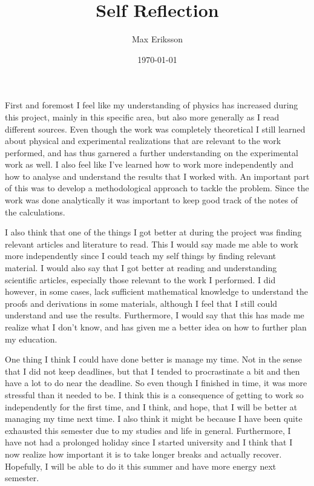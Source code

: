 \documentclass[12pt]{article}
\title{Self Reflection}
\date{\today}
\author{Max Eriksson}
\begin{document}
\maketitle

First and foremost I feel like my understanding of physics has increased during this project, mainly in this specific area, but also more generally as I read different sources. Even though the work was completely theoretical I still learned about physical and experimental realizations that are relevant to the work performed, and has thus garnered a further understanding on the experimental work as well. I also feel like I've learned how to work more independently and how to analyse and understand the results that I worked with. An important part of this was to develop a methodological approach to tackle the problem. Since the work was done analytically it was important to keep good track of the notes of the calculations.

I also think that one of the things I got better at during the project was finding relevant articles and literature to read. This I would say made me able to work more independently since I could teach my self things by finding relevant material. I would also say that I got better at reading and understanding scientific articles, especially those relevant to the work I performed. I did however, in some cases, lack sufficient mathematical knowledge to understand the proofs and derivations in some materials, although I feel that I still could understand and use the results. Furthermore, I would say that this has made me realize what I don't know, and has given me a better idea on how to further plan my education. 

One thing I think I could have done better is manage my time. Not in the sense that I did not keep deadlines, but that I tended to procrastinate a bit and then have a lot to do near the deadline. So even though I finished in time, it was more stressful than it needed to be. I think this is a consequence of getting to work so independently for the first time, and I think, and hope, that I will be better at managing my time next time. I also think it might be because I have been quite exhausted  this semester due to my studies and life in general. Furthermore, I have not had a prolonged holiday since I started university and I think that I now realize how important it is to take longer breaks and actually recover. Hopefully, I will be able to do it this summer and have more energy next semester. 
\end{document}
